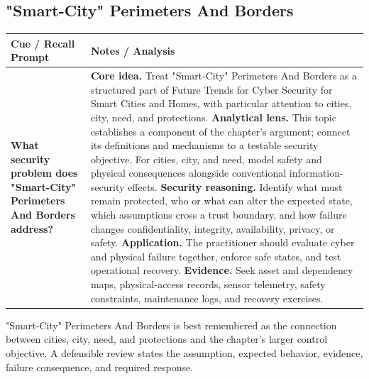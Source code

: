 \documentclass[11pt]{article}
\newcommand{\CornellHeader}{%
\rowcolor{Navy}\color{white}\bfseries Cue / Recall Prompt & \color{white}\bfseries Notes / Analysis\\\hline}
\newcommand{\CornellRow}[2]{%
\cellcolor{CueGray}\RaggedRight\textbf{#1} & \RaggedRight #2\\\hline}
\begin{document}
\subsection*{"Smart-City" Perimeters And Borders}
\begin{longtable}{>{\RaggedRight\arraybackslash}p{}|>{\RaggedRight\arraybackslash}p{}}
\CornellHeader
\CornellRow{What security problem does "Smart-City" Perimeters And Borders address?}{\textbf{Core idea.} Treat "Smart-City" Perimeters And Borders as a structured part of Future Trends for Cyber Security for Smart Cities and Homes, with particular attention to cities, city, need, and protections. \textbf{Analytical lens.} This topic establishes a component of the chapter's argument; connect its definitions and mechanisms to a testable security objective. For cities, city, and need, model safety and physical consequences alongside conventional information-security effects. \textbf{Security reasoning.} Identify what must remain protected, who or what can alter the expected state, which assumptions cross a trust boundary, and how failure changes confidentiality, integrity, availability, privacy, or safety. \textbf{Application.} The practitioner should evaluate cyber and physical failure together, enforce safe states, and test operational recovery. \textbf{Evidence.} Seek asset and dependency maps, physical-access records, sensor telemetry, safety constraints, maintenance logs, and recovery exercises.}
\end{longtable}
\begin{topicsummary}
"Smart-City" Perimeters And Borders is best remembered as the connection between cities, city, need, and protections and the chapter's larger control objective. A defensible review states the assumption, expected behavior, evidence, failure consequence, and required response.
\end{topicsummary}
\end{document}
